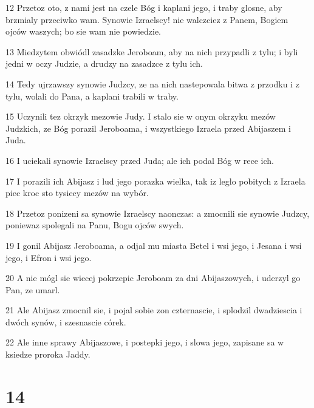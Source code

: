 \par 12 Przetoz oto, z nami jest na czele Bóg i kaplani jego, i traby glosne, aby brzmialy przeciwko wam. Synowie Izraelscy! nie walczciez z Panem, Bogiem ojców waszych; bo sie wam nie powiedzie.
\par 13 Miedzytem obwiódl zasadzke Jeroboam, aby na nich przypadli z tylu; i byli jedni w oczy Judzie, a drudzy na zasadzce z tylu ich.
\par 14 Tedy ujrzawszy synowie Judzcy, ze na nich nastepowala bitwa z przodku i z tylu, wolali do Pana, a kaplani trabili w traby.
\par 15 Uczynili tez okrzyk mezowie Judy. I stalo sie w onym okrzyku mezów Judzkich, ze Bóg porazil Jeroboama, i wszystkiego Izraela przed Abijaszem i Juda.
\par 16 I uciekali synowie Izraelscy przed Juda; ale ich podal Bóg w rece ich.
\par 17 I porazili ich Abijasz i lud jego porazka wielka, tak iz leglo pobitych z Izraela piec kroc sto tysiecy mezów na wybór.
\par 18 Przetoz ponizeni sa synowie Izraelscy naonczas: a zmocnili sie synowie Judzcy, poniewaz spolegali na Panu, Bogu ojców swych.
\par 19 I gonil Abijasz Jeroboama, a odjal mu miasta Betel i wsi jego, i Jesana i wsi jego, i Efron i wsi jego.
\par 20 A nie mógl sie wiecej pokrzepic Jeroboam za dni Abijaszowych, i uderzyl go Pan, ze umarl.
\par 21 Ale Abijasz zmocnil sie, i pojal sobie zon czternascie, i splodzil dwadziescia i dwóch synów, i szesnascie córek.
\par 22 Ale inne sprawy Abijaszowe, i postepki jego, i slowa jego, zapisane sa w ksiedze proroka Jaddy.

\chapter{14}

